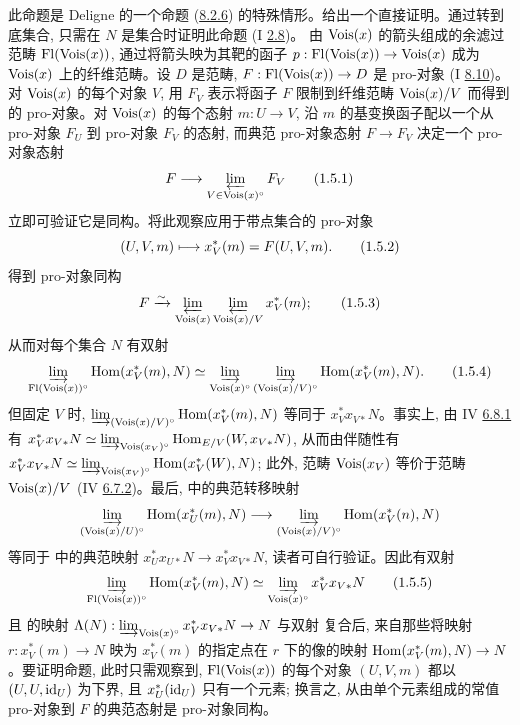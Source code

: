 此命题是 Deligne 的一个命题 (\hyperref[V.prop8.2.6]{8.2.6}) 的特殊情形。给出一个直接证明。通过转到底集合, 只需在 $N$ 是集合时证明此命题 (I \hyperref[I.prop2.8]{2.8})。%
由 $\operatorname{Vois}(x)$ 的箭头组成的余滤过范畴 $\mathrm{Fl}(\operatorname{Vois}(x))$, 通过将箭头映为其靶的函子 $p:\mathrm{Fl}(\Vois(x))\to\Vois(x)$ 成为 $\operatorname{Vois}(x)$ 上的纤维范畴。设 $D$ 是范畴, $F:\mathrm{Fl}(\Vois(x))\to D$ 是 pro-对象 (I \hyperref[I.sec8.10]{8.10})。%
对 $\operatorname{Vois}(x)$ 的每个对象 $V$, 用 $F_V$ 表示将函子 $F$ 限制到纤维范畴 $\operatorname{Vois}(x)/V$ 而得到的 pro-对象。对 $\operatorname{Vois}(x)$ 的每个态射 $m:U\to V$, 沿 $m$ 的基变换函子配以一个从 pro-对象 $F_U$ 到 pro-对象 $F_V$ 的态射, 而典范 pro-对象态射 $F\to F_V$ 决定一个 pro-对象态射
\begin{equation*}
F\to\varprojlim_{V\in\Vois(x)^{\circ}}F_V\tag{1.5.1}
\end{equation*}
立即可验证它是同构。将此观察应用于带点集合的 pro-对象
\begin{equation*}
(U,V,m)\longmapsto x^{\ast}_V(m)=F(U,V,m){}.\tag{1.5.2}
\end{equation*}
得到 pro-对象同构
\begin{equation*}
F\xrightarrow{\sim}\varprojlim_{\operatorname{Vois}(x)}
\varprojlim_{\operatorname{Vois}(x)/V}x^{\ast}_V(m){};\tag{1.5.3}
\end{equation*}
从而对每个集合 $N$ 有双射
\begin{equation*}
\varinjlim_{\mathrm{Fl}(\operatorname{Vois}(x))^{\circ}}
\operatorname{Hom}(x^{\ast}_V(m),N)\simeq
\varinjlim_{\operatorname{Vois}(x)^{\circ}}
\varinjlim_{(\operatorname{Vois}(x)/V)^{\circ}}
\operatorname{Hom}(x^{\ast}_V(m),N).\tag{1.5.4}
\end{equation*}
但\pageoriginale 固定 $V$ 时, $\varinjlim_{(\operatorname{Vois}(x)/V)^{\circ}}\operatorname{Hom}(x^{\ast}_V(m),N)$ 等同于 $x^{\ast}_Vx_{V\ast}N$。事实上, 由 IV \hyperref[IV.eq6.8.1]{6.8.1} 有 $x^{\ast}_Vx_{V\ast}N\simeq
\varinjlim_{\operatorname{Vois}(x_V)^\circ}\operatorname{Hom}_{E/V}(W,x_{V\ast}N)$, 从而由伴随性有 $x^{\ast}_Vx_{V\ast}N\simeq
\varinjlim_{\operatorname{Vois}(x_V)^\circ}\operatorname{Hom}(x^{\ast}_V(W),N)$; 此外, 范畴 $\operatorname{Vois}(x_V)$ 等价于范畴 $\operatorname{Vois}(x)/V$ (IV \hyperref[IV.eq6.7.2]{6.7.2})。最后,  中的典范转移映射 \[
\varinjlim_{(\Vois(x)/U)^{\circ}}\Hom(x^{\ast}_U(m),N)\to
\varinjlim_{(\Vois(x)/V)^{\circ}}\Hom(x^{\ast}_V(n),N)
\] 等同于  中的典范映射 $x^{\ast}_Ux_{U\ast}N\to x^{\ast}_Vx_{V\ast}N$, 读者可自行验证。因此有双射
\begin{equation*}
\varinjlim_{\mathrm{Fl}(\operatorname{Vois}(x))^{\circ}}
\operatorname{Hom}(x^{\ast}_V(m),N)\simeq
\varinjlim_{\operatorname{Vois}(x)^{\circ}}x^{\ast}_Vx_{V\ast}N\tag{1.5.5}
\end{equation*}
且  的映射 $\Lambda(N):\varinjlim_{\Vois(x)^{\circ}}x^{\ast}_Vx_{V\ast}N\to N$ 与双射  复合后, 来自那些将映射 $r:x^{\ast}_V(m)\to N$ 映为 $x^{\ast}_V(m)$ 的指定点在 $r$ 下的像的映射 $\Hom(x^{\ast}_V(m),N)\to N$。要证明命题, 此时只需观察到, $\mathrm{Fl}(\operatorname{Vois}(x))$ 的每个对象 $(U,V,m)$ 都以 $(U,U,\operatorname{id}_U)$ 为下界, 且 $x^{\ast}_U(\operatorname{id}_U)$ 只有一个元素; 换言之, 从由单个元素组成的常值 pro-对象到 $F$ 的典范态射是 pro-对象同构。

